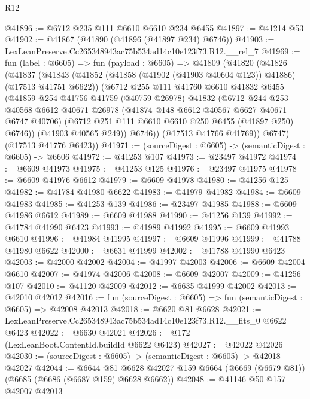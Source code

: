 \begin{lexlean}{R12}
\begin{coremodule}
@41896 := @6712 @235 @111 @6610 @6610 @234 @6455
@41897 := @41214 @53
@41902 := @41867 (@41890 (@41896 (@41897 @234) @6746))
@41903 := LexLeanPreserve.Cc265348943ac75b534ad14c10e123f73.R12.__rel_7
@41969 := fun (label : @6605) =>
  fun (payload : @6605) =>
  @41809
    (@41820
      (@41826
        (@41837
          (@41843
            (@41852 (@41858 (@41902 (@41903 @40604 @123)) @41886) (@17513 @41751 @6622))
            (@6712
              @255
              @111
              @41760
              @6610
              @41832
              @6455
              (@41859
                @254
                @41756
                @41759
                (@40759 @26978)
                @41832
                (@6712
                  @244
                  @253
                  @40568
                  @6612
                  @40671
                  @26978
                  (@41874 @148 @6612 @40567 @6627 @40671 @6747 @40706)
                  (@6712 @251 @111 @6610 @6610 @250 @6455 (@41897 @250) @6746))
                (@41903 @40565 @249))
              @6746))
          (@17513 @41766 @41769))
        @6747)
      (@17513 @41776 @6423))
@41971 := (sourceDigest : @6605) -> (semanticDigest : @6605) -> @6606
@41972 := @41253 @107
@41973 := @23497 @41972
@41974 := @6609 @41973
@41975 := @41253 @125
@41976 := @23497 @41975
@41978 := @6609 @41976 @6612
@41979 := @6609 @41978
@41980 := @41256 @125
@41982 := @41784 @41980 @6622
@41983 := @41979 @41982
@41984 := @6609 @41983
@41985 := @41253 @139
@41986 := @23497 @41985
@41988 := @6609 @41986 @6612
@41989 := @6609 @41988
@41990 := @41256 @139
@41992 := @41784 @41990 @6423
@41993 := @41989 @41992
@41995 := @6609 @41993 @6610
@41996 := @41984 @41995
@41997 := @6609 @41996
@41999 := @41788 @41980 @6622
@42000 := @6631 @41999
@42002 := @41788 @41990 @6423
@42003 := @42000 @42002
@42004 := @41997 @42003
@42006 := @6609 @42004 @6610
@42007 := @41974 @42006
@42008 := @6609 @42007
@42009 := @41256 @107
@42010 := @41120 @42009
@42012 := @6635 @41999 @42002
@42013 := @42010 @42012
@42016 := fun (sourceDigest : @6605) => fun (semanticDigest : @6605) => @42008 @42013
@42018 := @6620 @81 @6628
@42021 := LexLeanPreserve.Cc265348943ac75b534ad14c10e123f73.R12.__fits_0 @6622 @6423
@42022 := @6630 @42021
@42026 := @172 (LexLeanBoot.ContentId.buildId @6622 @6423)
@42027 := @42022 @42026
@42030 := (sourceDigest : @6605) -> (semanticDigest : @6605) -> @42018 @42027
@42044 := @6644
    @81
    @6628
    @42027
    @159
    @6664
    (@6669 (@6679 @81))
    (@6685 (@6686 (@6687 @159) @6628 @6662))
@42048 := @41146 @50 @157 @42007 @42013

\end{coremodule}
\end{lexlean}
